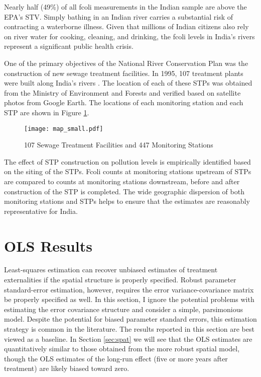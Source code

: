 \documentclass[12pt]{article}
\begin{document}
Nearly half (49\%) of all fcoli measurements in the Indian sample are above the EPA's STV. Simply bathing in an Indian river carries a substantial risk of contracting a waterborne illness. Given that millions of Indian citizens also rely on river water for cooking, cleaning, and drinking, the fcoli levels in India's rivers represent a significant public health crisis. 

One of the primary objectives of the National River Conservation Plan was the construction of new sewage treatment facilities. In 1995, 107 treatment plants were built along India's rivers \citep{nrcd2013}. The location of each of these STPs was obtained from the Ministry of Environment and Forests and verified based on satellite photos from Google Earth. The locations of each monitoring station and each STP are shown in Figure \ref{fig:map}. 

\begin{figure}[!t]
  \centering
  \texttt{[image: map\_small.pdf]}
  \caption{107 Sewage Treatment Facilities and 447 Monitoring Stations}
  \label{fig:map}
\end{figure}

The effect of STP construction on pollution levels is empirically identified based on the siting of the STPs. Fcoli counts at monitoring stations upstream of STPs are compared to counts at monitoring stations downstream, before and after construction of the STP is completed. The wide geographic dispersion of both monitoring stations and STPs helps to ensure that the estimates are reasonably representative for India.


\section{OLS Results} \label{sec:ols}

Least-squares estimation can recover unbiased estimates of treatment externalities if the spatial structure is properly specified. Robust parameter standard-error estimation, however, requires the error variance-covariance matrix be properly specified as well. In this section, I ignore the potential problems with estimating the error covariance structure and consider a simple, parsimonious model. Despite the potential for biased parameter standard errors, this estimation strategy is common in the literature. The results reported in this section are best viewed as a baseline. In Section \ref{sec:spat} we will see that the OLS estimates are quantitatively similar to those obtained from the more robust spatial model, though the OLS estimates of the long-run effect (five or more years after treatment) are likely biased toward zero.
\end{document}
